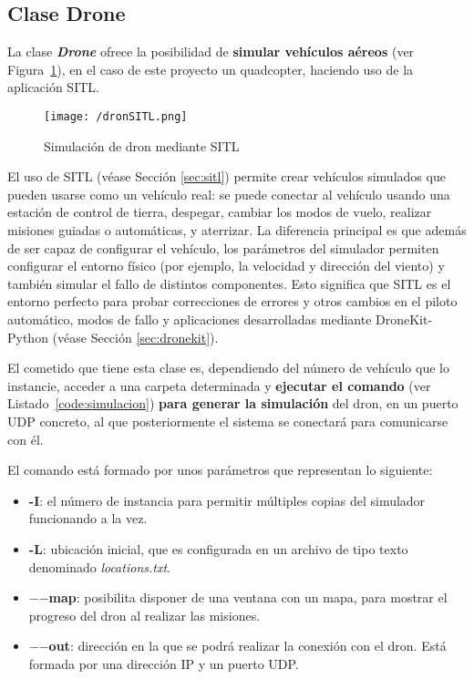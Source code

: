 \subsection{Clase Drone}

La clase \textbf{\textit{Drone}} ofrece la posibilidad de \textbf{simular vehículos aéreos} (ver Figura~\ref{fig:dronSITL}), en el caso de este proyecto un quadcopter, haciendo uso de la aplicación \acs{SITL}.

\begin{figure}[!h]
\begin{center}
\texttt{[image: /dronSITL.png]}
\caption[Simulación de dron mediante \acs{SITL}]{Simulación de dron mediante \acs{SITL}}
\label{fig:dronSITL}
\end{center}
\end{figure}

El uso de \acs{SITL} (véase Sección \ref{sec:sitl}) permite crear vehículos simulados que pueden usarse como un vehículo real: se puede conectar al vehículo usando una estación de control de tierra, despegar, cambiar los modos de vuelo, realizar misiones guiadas o automáticas, y aterrizar. La diferencia principal es que además de ser capaz de configurar el vehículo, los parámetros del simulador permiten configurar el entorno físico (por ejemplo, la velocidad y dirección del viento) y también simular el fallo de distintos componentes. Esto significa que \acs{SITL} es el entorno perfecto para probar correcciones de errores y otros cambios en el piloto automático, modos de fallo y aplicaciones desarrolladas mediante DroneKit-Python (véase Sección \ref{sec:dronekit}).

\clearpage

El cometido que tiene esta clase es, dependiendo del número de vehículo que lo instancie, acceder a una carpeta determinada y \textbf{ejecutar el comando} (ver Listado~\ref{code:simulacion}) \textbf{para generar la simulación} del dron, en un puerto UDP concreto, al que posteriormente el sistema se conectará para comunicarse con él.


El comando está formado por unos parámetros que representan lo siguiente:
\begin{itemize}
\item \textbf{-I}: el número de instancia para permitir múltiples copias del simulador funcionando a la vez.
\item \textbf{-L}: ubicación inicial, que es configurada en un archivo de tipo texto denominado \textit{locations.txt}.
\item \textbf{$-$$-$map}: posibilita disponer de una ventana con un mapa, para mostrar el progreso del dron al realizar las misiones.
\item \textbf{$-$$-$out}: dirección en la que se podrá realizar la conexión con el dron. Está formada por una dirección IP y un puerto UDP.
\end{itemize}

